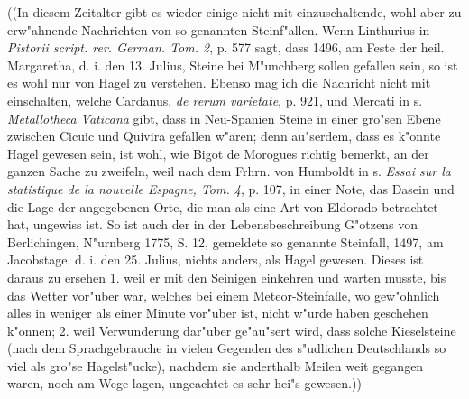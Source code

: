 \documentclass[a4paper, 11pt, oneside, polutonikogreek, german]{article}
\begin{document}
((In diesem Zeitalter gibt es wieder einige nicht mit einzuschaltende, wohl aber zu erw"ahnende Nachrichten von so genannten Steinf"allen. Wenn Linthurius in \emph{Pistorii script. rer. German. Tom. 2}, p. 577 sagt, dass 1496, am Feste der heil. Margaretha, d. i. den 13. Julius, Steine bei M"unchberg sollen gefallen sein, so ist es wohl nur von Hagel zu verstehen. Ebenso mag ich die Nachricht nicht mit einschalten, welche Cardanus, \emph{de rerum varietate}, p. 921, und Mercati in s. \emph{Metallotheca Vaticana} gibt, dass in Neu-Spanien Steine in einer gro"sen Ebene zwischen Cicuic und Quivira gefallen w"aren; denn au"serdem, dass es k"onnte Hagel gewesen sein, ist wohl, wie Bigot de Morogues richtig bemerkt, an der ganzen Sache zu zweifeln, weil nach dem Frhrn. von Humboldt in s. \emph{Essai sur la statistique de la nouvelle Espagne, Tom. 4}, p. 107, in einer Note, das Dasein und die Lage der angegebenen Orte, die man als eine Art von Eldorado betrachtet hat, ungewiss ist. So ist auch der in der Lebensbeschreibung G"otzens von Berlichingen, N"urnberg 1775, S. 12, gemeldete so genannte Steinfall, 1497, am Jacobstage, d. i. den 25. Julius, nichts anders, als Hagel gewesen. Dieses ist daraus zu ersehen 1. weil er mit den Seinigen einkehren und warten musste, bis das Wetter vor"uber war, welches bei einem Meteor-Steinfalle, wo gew"ohnlich alles in weniger als einer Minute vor"uber ist, nicht w"urde haben geschehen k"onnen; 2. weil Verwunderung dar"uber ge"au"sert wird, dass solche Kieselsteine (nach dem Sprachgebrauche in vielen Gegenden des s"udlichen Deutschlands so viel als gro"se Hagelst"ucke), nachdem sie anderthalb Meilen weit gegangen waren, noch am Wege lagen, ungeachtet es sehr hei"s gewesen.))
\end{document}

